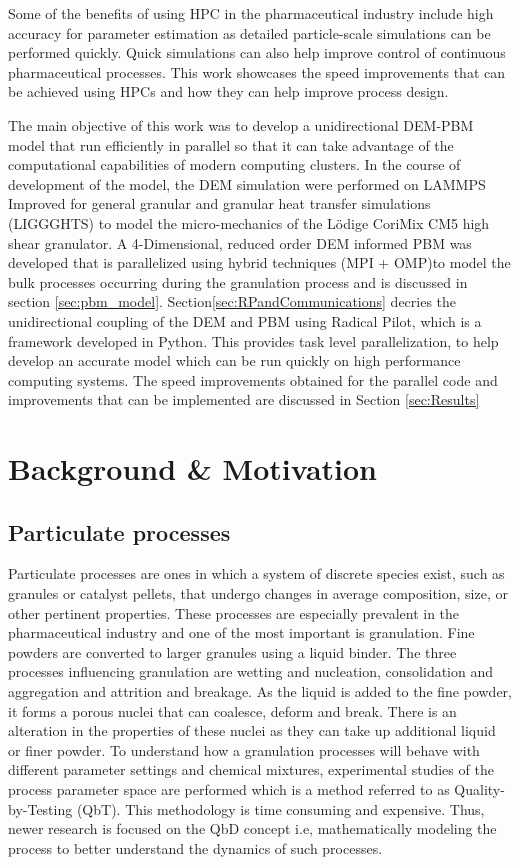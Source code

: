 \documentclass[preprint,11pt,authoryear]{elsarticle}
\begin{document}
Some of the benefits of using
HPC in the pharmaceutical industry include high accuracy for parameter estimation as detailed 
particle-scale simulations can be performed quickly. Quick simulations can also help 
improve control of continuous pharmaceutical processes. This work showcases the speed improvements 
that can be achieved using HPCs and how they can help improve process design.

The main objective of this work was to develop a unidirectional DEM-PBM model that run efficiently in 
parallel so that it can take advantage of the computational capabilities of  modern computing 
clusters. In the course of development of the model, the DEM simulation were performed on 
LAMMPS Improved for general granular and granular heat transfer simulations (LIGGGHTS) \citep{Kloss2012} to  
model the micro-mechanics of the L\"{o}dige CoriMix CM5 high shear granulator. A 4-Dimensional, 
reduced order DEM informed PBM was developed that is parallelized using hybrid techniques 
(MPI + OMP)to model the bulk processes occurring during the granulation process and 
is discussed in section \ref{sec:pbm_model}. Section\ref{sec:RPandCommunications} decries 
the unidirectional coupling of the DEM and PBM using Radical Pilot, which is a 
framework developed in Python. This provides task level parallelization, to help develop 
an accurate model which can be run quickly on high performance computing systems. The speed
improvements obtained for the parallel code and improvements that can be implemented are discussed
in Section \ref{sec:Results}


\section{Background \& Motivation}

\subsection{Particulate processes}
Particulate processes are ones in which a system of discrete species exist, such as granules 
or catalyst pellets, that undergo changes in average composition, size, or other pertinent 
properties. These processes are especially prevalent in the pharmaceutical industry and one of the 
most important is granulation. 
Fine powders are converted to larger granules using a liquid binder. The three processes 
influencing granulation are wetting and nucleation, consolidation and aggregation and attrition and 
breakage\citep{Iveson2001}\citep{Cameron2005}. As the liquid is added to the fine powder, it 
forms a porous nuclei that can coalesce, deform and break\citep{Barrasso2015ces}. There is an 
alteration in the properties of these nuclei as they can take up additional liquid or finer powder.
To understand how a granulation processes will behave with different parameter settings and 
chemical mixtures, experimental studies of the process parameter space are performed which is a 
method referred to as Quality-by-Testing (QbT). This methodology is time consuming and 
expensive. Thus, newer research is focused on the QbD concept i.e, 
mathematically modeling the process to better understand the dynamics of such processes.
\end{document}
